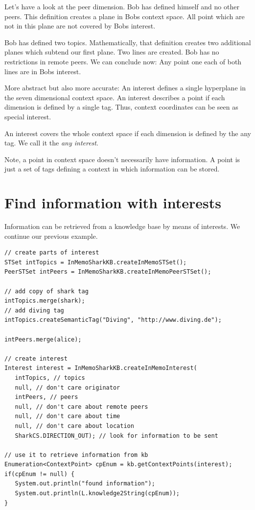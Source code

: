 Let's have a look at the peer dimension. Bob has defined himself and no other peers. This definition creates a plane in Bobs context space. All point which are not in this plane are not covered by Bobs interest.

Bob has defined two topics. Mathematically, that definition creates two additional planes which subtend our first plane. Two lines are created. Bob has no restrictions in remote peers. We can conclude now: Any point one each of both lines are in Bobs interest. 

More abstract but also more accurate: An interest defines a single hyperplane in the seven dimensional context space. An interest describes a point if each dimension is defined by a single tag. Thus, context coordinates can be seen as special interest.

An interest covers the whole context space if each dimension is defined by the any tag. We call it the {\it any interest}.

Note, a point in context space doesn't necessarily have information. A point is just a set of tags defining a context in which information can be stored.

\section{Find information with interests}
Information can be retrieved from a knowledge base by means of interests.
We continue our previous example.

\begin{verbatim}
// create parts of interest
STSet intTopics = InMemoSharkKB.createInMemoSTSet();
PeerSTSet intPeers = InMemoSharkKB.createInMemoPeerSTSet();

// add copy of shark tag
intTopics.merge(shark);
// add diving tag
intTopics.createSemanticTag("Diving", "http://www.diving.de");

intPeers.merge(alice);

// create interest
Interest interest = InMemoSharkKB.createInMemoInterest(
   intTopics, // topics
   null, // don't care originator
   intPeers, // peers
   null, // don't care about remote peers
   null, // don't care about time
   null, // don't care about location
   SharkCS.DIRECTION_OUT); // look for information to be sent

// use it to retrieve information from kb
Enumeration<ContextPoint> cpEnum = kb.getContextPoints(interest);
if(cpEnum != null) {
   System.out.println("found information");
   System.out.println(L.knowledge2String(cpEnum));
}
\end{verbatim}

